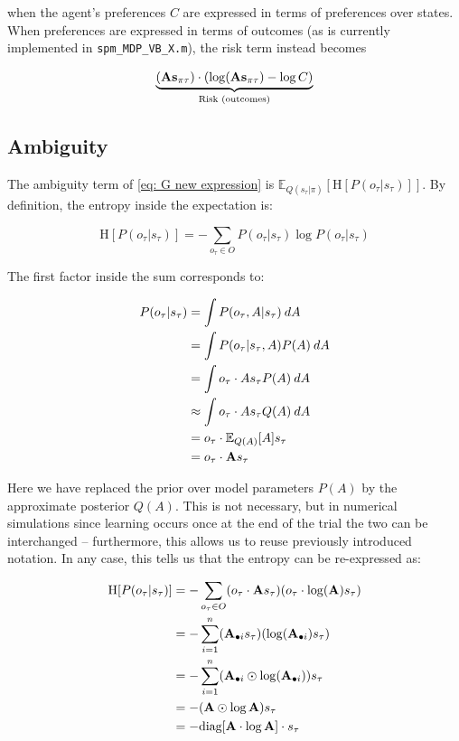 \documentclass[review,12pt,authoryear]{elsarticle}
\begin{document}
    when the agent's preferences $C$ are expressed in terms of preferences over states. When preferences are expressed in terms of outcomes (as is currently implemented in \texttt{spm\_MDP\_VB\_X.m}), the risk term instead becomes
    
    \begin{equation}
    \label{eq: sol efe computation outcomes}
		\underbrace{(\bold A \bold s_{\pi\tau}) \cdot ( \log (\bold A \bold s_{\pi\tau}) - \log C)}_{\text{Risk (outcomes)}}
	\end{equation}
	
	\subsection{Ambiguity}
	
	The ambiguity term of \eqref{eq: G new expression} is $\mathbb E_{Q(s_\tau|\pi)} [\text{H}[P(o_\tau |s_\tau)]]$. By definition, the entropy inside the expectation is:
	
	\begin{equation}
	\text{H}[P(o_\tau |s_\tau )]=-\sum_{o_\tau \in O} P(o_\tau |s_\tau )\log P(o_\tau|s_\tau ) 
	\end{equation}
	
	The first factor inside the sum corresponds to:
	
	\begin{equation}
		\begin{split}
			P(o_\tau |s_\tau) &=\int P(o_\tau,A|s_\tau)\: dA \\
			&=\int P(o_\tau |s_\tau,A)P(A)\:dA \\
			&=\int o_\tau \cdot As_\tau P(A)\:dA \\
			&\approx \int o_\tau \cdot As_\tau Q(A) \: dA \\
			&= o_\tau \cdot \mathbb E_{ Q ( A )} [A] s_\tau  \\
			&=o_\tau \cdot \bold As_\tau 
		\end{split}
	\end{equation}

	Here we have replaced the prior over model parameters $P( A)$ by the approximate posterior $Q( A)$. This is not necessary, but in numerical simulations since learning occurs once at the end of the trial the two can be interchanged -- furthermore, this allows us to reuse previously introduced notation. In any case, this tells us that the entropy can be re-expressed as:
	
	\begin{equation}
		\begin{split}
			\text{H}[P(o_\tau |s_\tau )] &= - \sum_{o_\tau \in O} (o_\tau \cdot \bold As_\tau )(o_\tau \cdot \log (\bold A)s_\tau ) \\
		&= - \sum_{i=1}^n (\bold A_{\bullet i}s_\tau)(\log(\bold A_{\bullet i})s_\tau) \\
		&= - \sum_{i=1}^n (\bold A_{\bullet i}\odot \log (\bold A_{\bullet i}))s_\tau \\
		&= - (\bold A\odot \log \bold A)s_\tau\\
		&= - \text{diag} [\bold A \cdot \log \bold A ] \cdot s_\tau 
		\end{split}
	\end{equation}
	
\end{document}
